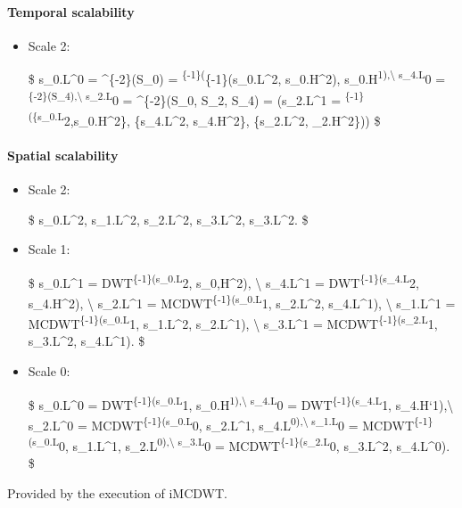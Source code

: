 {\paragraph{Temporal scalability}
\begin{itemize}
\item
  Scale 2:

  \$ s\_0.L\^{}0 = \^{}\{-2\}(S\_0) =
  \textsuperscript{\{-1\}(}\{-1\}(s\_0.L\^{}2,
  s\_0.H\^{}2), s\_0.H\textsuperscript{1),\textbackslash{} s\_4.L}0 =
  \textsuperscript{\{-2\}(S\_4),\textbackslash{} s\_2.L}0 =
  \^{}\{-2\}(S\_0, S\_2, S\_4) = (s\_2.L\^{}1 =
  \textsuperscript{\{-1\}(\{s\_0.L}2,s\_0.H\^{}2\},
  \{s\_4.L\^{}2, s\_4.H\^{}2\}, \{s\_2.L\^{}2, \_2.H\^{}2\}))
  \$
\end{itemize}

\paragraph{Spatial scalability}
\begin{itemize}
\item
  Scale 2:

  \$ s\_0.L\^{}2, s\_1.L\^{}2, s\_2.L\^{}2, s\_3.L\^{}2, s\_3.L\^{}2. \$
\item
  Scale 1:

  \$ s\_0.L\^{}1 = DWT\textsuperscript{\{-1\}(s\_0.L}2, s\_0,H\^{}2),
  \textbackslash{} s\_4.L\^{}1 = DWT\textsuperscript{\{-1\}(s\_4.L}2,
  s\_4.H\^{}2), \textbackslash{} s\_2.L\^{}1 =
  MCDWT\textsuperscript{\{-1\}(s\_0.L}1, s\_2.L\^{}2, s\_4.L\^{}1),
  \textbackslash{} s\_1.L\^{}1 = MCDWT\textsuperscript{\{-1\}(s\_0.L}1,
  s\_1.L\^{}2, s\_2.L\^{}1), \textbackslash{} s\_3.L\^{}1 =
  MCDWT\textsuperscript{\{-1\}(s\_2.L}1, s\_3.L\^{}2, s\_4.L\^{}1). \$
\item
  Scale 0:

  \$ s\_0.L\^{}0 = DWT\textsuperscript{\{-1\}(s\_0.L}1,
  s\_0.H\textsuperscript{1),\textbackslash{} s\_4.L}0 =
  DWT\textsuperscript{\{-1\}(s\_4.L}1, s\_4.H`1),\textbackslash{}
  s\_2.L\^{}0 = MCDWT\textsuperscript{\{-1\}(s\_0.L}0, s\_2.L\^{}1,
  s\_4.L\textsuperscript{0),\textbackslash{} s\_1.L}0 =
  MCDWT\textsuperscript{\{-1\}(s\_0.L}0, s\_1.L\^{}1,
  s\_2.L\textsuperscript{0),\textbackslash{} s\_3.L}0 =
  MCDWT\textsuperscript{\{-1\}(s\_2.L}0, s\_3.L\^{}2, s\_4.L\^{}0). \$
\end{itemize}

    Provided by the execution of iMCDWT.

}
